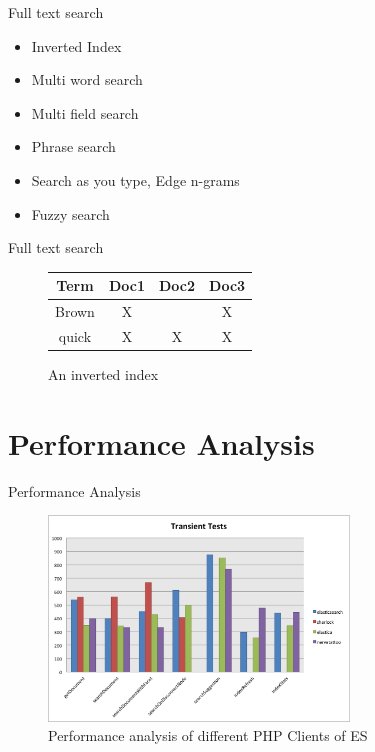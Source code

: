 \documentclass[10pt]{beamer}
\begin{document}
\begin{frame}{Full text search}
	\begin{itemize}
		\item Inverted Index
		\item Multi word  search
		\item Multi field search
		\item Phrase search
		\item Search as you type, Edge n-grams
		\item Fuzzy search
	\end{itemize}
\end{frame}

\begin{frame}{Full text search}
\begin{figure}[ht]
	\begin{center}
	\begin{tabular}{|c|c|c|c|}
		\hline
		Term & Doc1 & Doc2 & Doc3\\
		\hline
		\hline
		Brown & X &  & X \\
		\hline
		quick & X & X & X \\
		\hline
	\end{tabular} 
	\caption{An inverted index}
	\end{center}
	\end{figure}
\end{frame}

\section{Performance Analysis}

\begin{frame}{Performance Analysis}
	\begin{figure}
		\centering\includegraphics[width=8cm]{clients}
		\caption{Performance analysis of different PHP Clients of ES}
	\end{figure}
\end{frame}
\end{document}
